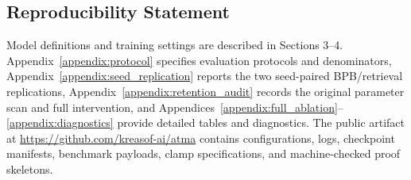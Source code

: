 \documentclass{article}
\begin{document}
\subsection*{Reproducibility Statement}
Model definitions and training settings are described in Sections 3--4. Appendix~\ref{appendix:protocol} specifies evaluation protocols and denominators, Appendix~\ref{appendix:seed_replication} reports the two seed-paired BPB/retrieval replications, Appendix~\ref{appendix:retention_audit} records the original parameter scan and full intervention, and Appendices~\ref{appendix:full_ablation}--\ref{appendix:diagnostics} provide detailed tables and diagnostics. The public artifact at \url{https://github.com/kreasof-ai/atma} contains configurations, logs, checkpoint manifests, benchmark payloads, clamp specifications, and machine-checked proof skeletons.




\appendix

\end{document}

